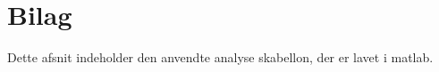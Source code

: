 \chapter{Bilag}\label{ch:Bilag}

Dette afsnit indeholder den anvendte analyse skabellon, der er lavet i matlab.

